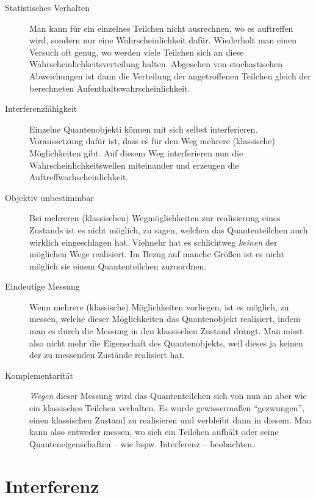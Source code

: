\begin{description}
   \item[Statistisches Verhalten] Man kann für ein einzelnes Teilchen nicht ausrechnen, wo es auftreffen wird, sondern nur eine Wahrscheinlichkeit dafür. Wiederholt man einen Versuch oft genug, wo werden viele Teilchen sich an diese Wahrscheinlichkeitsverteilung halten. Abgesehen von stochastischen Abweichungen ist dann die Verteilung der angetroffenen Teilchen gleich der berechneten Aufenthaltswahrscheinlichkeit.
   \item[Interferenzfähigkeit] Einzelne Quantenobjekti können mit sich selbst interferieren. Voraussetzung dafür ist, dass es für den Weg mehrere (klassische) Möglichkeiten gibt. Auf diesem Weg interferieren nun die Wahrscheinlichkeitswellen miteinander und erzeugen die Auftreffwarhscheinlichkeit.
   \item[Objektiv unbestimmbar] Bei mehreren (klassischen) Wegmöglichkeiten zur realisierung eines Zustands ist es nicht möglich, zu sagen, welchen das Quantenteilchen auch wirklich eingeschlagen hat. Vielmehr hat es schlichtweg \emph{keinen} der möglichen Wege realisiert. Im Bezug auf manche Größen ist es nicht möglich sie einem Quantenteilchen zuzuordnen.
   \item[Eindeutige Messung] Wenn mehrere (klassische) Möglichkeiten vorliegen, ist es möglich, zu messen, welche dieser Möglichkeiten das Quantenobjekt realisiert, indem man es durch die Messung in den klassischen Zustand drängt. Man misst also nicht mehr die Eigenschaft des Quantenobjekts, weil dieses ja keinen der zu messenden Zustände realisiert hat.
   \item[Komplementarität] \emph{Wegen} dieser Messung wird das Quantenteilchen sich von nun an aber wie ein klassisches Teilchen verhalten. Es wurde gewissermaßen "`gezwungen"', einen klassischen Zustand zu realisieren und verbleibt dann in diesem. Man kann also entweder messen, wo sich ein Teilchen aufhält oder seine Quanteneigenschaften -- wie bspw. Interferenz -- beobachten.
 \end{description}



\chapter{Interferenz}



